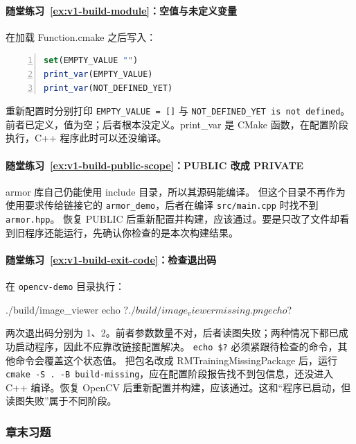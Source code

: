 \paragraph*{随堂练习~\ref{ex:v1-build-module}：空值与未定义变量}
\begin{solution}
在加载 Function.cmake 之后写入：
\begin{lstlisting}[language=cmake,frame=single,numbers=left]
set(EMPTY_VALUE "")
print_var(EMPTY_VALUE)
print_var(NOT_DEFINED_YET)
\end{lstlisting}
重新配置时分别打印 \texttt{EMPTY\_VALUE = []} 与 \texttt{NOT\_DEFINED\_YET is not defined}。前者已定义，值为空；后者根本没定义。print\_var 是 CMake 函数，在配置阶段执行，C++ 程序此时可以还没编译。
\end{solution}

\paragraph*{随堂练习~\ref{ex:v1-build-public-scope}：PUBLIC 改成 PRIVATE}
\begin{solution}
armor 库自己仍能使用 include 目录，所以其源码能编译。
但这个目录不再作为使用要求传给链接它的 \texttt{armor\_demo}，后者在编译 \texttt{src/main.cpp} 时找不到 \texttt{armor.hpp}。
恢复 PUBLIC 后重新配置并构建，应该通过。要是只改了文件却看到旧程序还能运行，先确认你检查的是本次构建结果。
\end{solution}

\paragraph*{随堂练习~\ref{ex:v1-build-exit-code}：检查退出码}
\begin{solution}
在 \texttt{opencv-demo} 目录执行：
\begin{tbash}
./build/image_viewer
echo $?
./build/image_viewer missing.png
echo $?
\end{tbash}
两次退出码分别为 1、2。前者参数数量不对，后者读图失败；两种情况下都已成功启动程序，因此不应靠改链接配置解决。
\texttt{echo \$?} 必须紧跟待检查的命令，其他命令会覆盖这个状态值。
把包名改成 RMTrainingMissingPackage 后，运行 \texttt{cmake -S . -B build-missing}，应在配置阶段报告找不到包信息，还没进入 C++ 编译。恢复 OpenCV 后重新配置并构建，应该通过。这和“程序已启动，但读图失败”属于不同阶段。
\end{solution}

\subsubsection*{章末习题}

